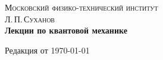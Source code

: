 \begin{titlepage}
\center
 
\textsc{\large Московский физико-технический институт}\\[1cm]
\textsc{\Large Л.\,П.\,Суханов}\\[6cm]

{ \Huge \bfseries Лекции по квантовой механике}\\[0.4cm]
 
\vfill

{\large Редакция от \today}
\end{titlepage}
\clearpage\thispagestyle{empty}